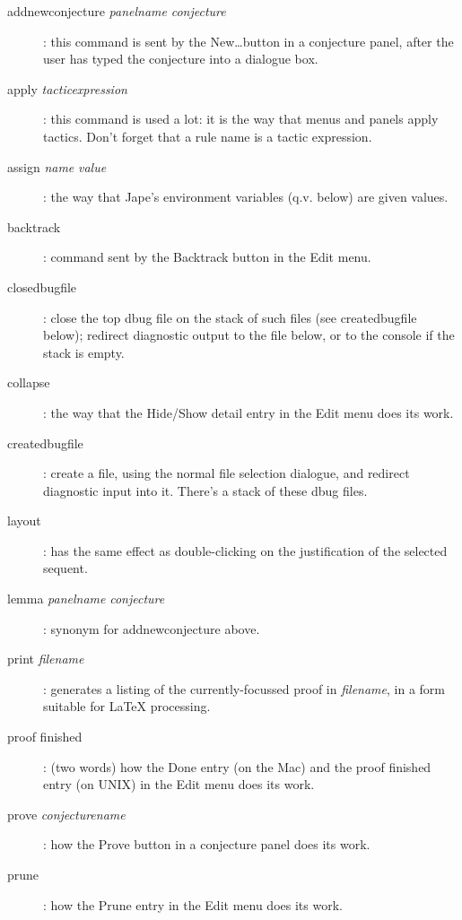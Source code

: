 \begin{description}
\item[addnewconjecture \textit{panelname} \textit{conjecture}]: this command is sent by the New\dots  button in a conjecture panel, after the user has typed the conjecture into a dialogue box.

\item[apply \textit{tacticexpression}]: this command is used a lot: it is the way that menus and panels apply tactics. Don't forget that a rule name is a tactic expression.


\item[assign \textit{name} \textit{value}]: the way that Jape's environment variables (q.v. below) are given values.


\item[backtrack]: command sent by the Backtrack button in the Edit menu.


\item[closedbugfile]: close the top dbug file on the stack of such files (see createdbugfile below); redirect diagnostic output to the file below, or to the console if the stack is empty.


\item[collapse]: the way that the Hide/Show detail entry in the Edit menu does its work.


\item[createdbugfile]: create a file, using the normal file selection dialogue, and redirect diagnostic input into it. There's a stack of these dbug files.


\item[layout]: has the same effect as double-clicking on the justification of the selected sequent.

\item[lemma \textit{panelname} \textit{conjecture}]: synonym for addnewconjecture above.


\item[print \textit{filename}]: generates a listing of the currently-focussed proof in \textit{filename}, in a form suitable for LaTeX processing.

\item[proof finished]: (two words) how the Done entry (on the Mac) and the proof finished entry (on UNIX) in the Edit menu does its work.


\item[prove \textit{conjecturename}]: how the Prove button in a conjecture panel does its work.

\item[prune]: how the Prune entry in the Edit menu does its work.


\end{description}
